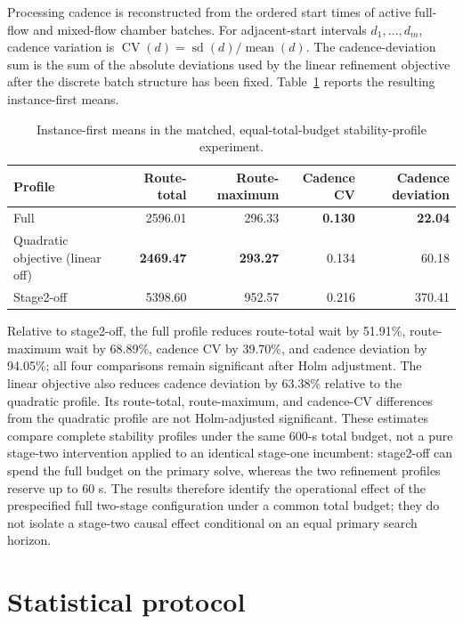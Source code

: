 \documentclass[11pt]{article}
\begin{document}
Processing cadence is reconstructed from the ordered start times of active
full-flow and mixed-flow chamber batches. For adjacent-start intervals
$d_1,\ldots,d_m$, cadence variation is
$\operatorname{CV}(d)=\operatorname{sd}(d)/\operatorname{mean}(d)$.
The cadence-deviation sum is the sum of the absolute deviations used by the
linear refinement objective after the discrete batch structure has been fixed.
Table~\ref{tab:stability-profiles} reports the resulting instance-first means.

\begin{table}[htbp]
\centering
\caption{Instance-first means in the matched, equal-total-budget
stability-profile experiment.}
\label{tab:stability-profiles}
\begin{tabular}{lrrrr}
\toprule
Profile & Route-total & Route-maximum & Cadence CV & Cadence deviation \\
\midrule
Full & 2596.01 & 296.33 & \textbf{0.130} & \textbf{22.04} \\
Quadratic objective (linear off) & \textbf{2469.47} & \textbf{293.27} & 0.134 & 60.18 \\
Stage2-off & 5398.60 & 952.57 & 0.216 & 370.41 \\
\bottomrule
\end{tabular}
\end{table}

Relative to stage2-off, the full profile reduces route-total wait by 51.91\%,
route-maximum wait by 68.89\%, cadence CV by 39.70\%, and cadence deviation by
94.05\%; all four comparisons remain significant after Holm adjustment. The
linear objective also reduces cadence deviation by 63.38\% relative to the
quadratic profile. Its route-total, route-maximum, and cadence-CV differences
from the quadratic profile are not Holm-adjusted significant. These estimates
compare complete stability profiles under the same 600-s total budget, not a
pure stage-two intervention applied to an identical stage-one incumbent:
stage2-off can spend the full budget on the primary solve, whereas the two
refinement profiles reserve up to 60 s. The results therefore identify the
operational effect of the prespecified full two-stage configuration under a
common total budget; they do not isolate a stage-two causal effect conditional
on an equal primary search horizon.

\section{Statistical protocol}
\end{document}
